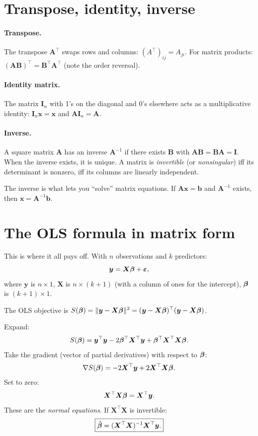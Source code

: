 \section{Transpose, identity, inverse}

\paragraph{Transpose.} The transpose $\bm{A}^\top$ swaps rows and columns: $(A^\top)_{ij} = A_{ji}$. For matrix products: $(\bm{A}\bm{B})^\top = \bm{B}^\top \bm{A}^\top$ (note the order reversal).

\paragraph{Identity matrix.} The matrix $\bm{I}_n$ with 1's on the diagonal and 0's elsewhere acts as a multiplicative identity: $\bm{I}_n \bm{x} = \bm{x}$ and $\bm{A}\bm{I}_n = \bm{A}$.

\paragraph{Inverse.} A square matrix $\bm{A}$ has an inverse $\bm{A}^{-1}$ if there exists $\bm{B}$ with $\bm{A}\bm{B} = \bm{B}\bm{A} = \bm{I}$. When the inverse exists, it is unique. A matrix is \emph{invertible} (or \emph{nonsingular}) iff its determinant is nonzero, iff its columns are linearly independent.

The inverse is what lets you ``solve'' matrix equations. If $\bm{A}\bm{x} = \bm{b}$ and $\bm{A}^{-1}$ exists, then $\bm{x} = \bm{A}^{-1}\bm{b}$.

\section{The OLS formula in matrix form}

This is where it all pays off. With $n$ observations and $k$ predictors:
\[
  \bm{y} = \bm{X}\bm{\beta} + \bm{\varepsilon},
\]
where $\bm{y}$ is $n \times 1$, $\bm{X}$ is $n \times (k+1)$ (with a column of ones for the intercept), $\bm{\beta}$ is $(k+1) \times 1$.

The OLS objective is $S(\bm{\beta}) = \|\bm{y} - \bm{X}\bm{\beta}\|^2 = (\bm{y} - \bm{X}\bm{\beta})^\top(\bm{y} - \bm{X}\bm{\beta})$.

Expand:
\[
  S(\bm{\beta}) = \bm{y}^\top \bm{y} - 2\bm{\beta}^\top \bm{X}^\top \bm{y} + \bm{\beta}^\top \bm{X}^\top \bm{X} \bm{\beta}.
\]
Take the gradient (vector of partial derivatives) with respect to $\bm{\beta}$:
\[
  \nabla S(\bm{\beta}) = -2 \bm{X}^\top \bm{y} + 2 \bm{X}^\top \bm{X} \bm{\beta}.
\]
Set to zero:
\[
  \bm{X}^\top \bm{X} \bm{\beta} = \bm{X}^\top \bm{y}.
\]
These are the \emph{normal equations}. If $\bm{X}^\top \bm{X}$ is invertible:
\begin{equation}
  \boxed{\hat{\bm{\beta}} = (\bm{X}^\top \bm{X})^{-1} \bm{X}^\top \bm{y}.}
\end{equation}

